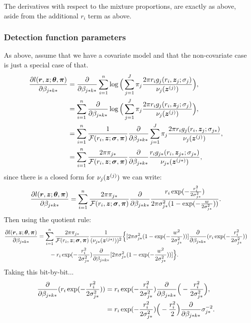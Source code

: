 The derivatives with respect to the mixture proportions, are exactly as above, aside from the additional $r_i$ term as above.


\subsubsection{Detection function parameters}

As above, assume that we have a covariate model and that the non-covariate case is just a special case of that.
\begin{align*}
\frac{\partial l(\bm{r}, \bm{z};\bm{\theta},\bm{\pi})}{\partial \beta_{j*k*}} &= \frac{\partial}{\partial \beta_{j*k*}} \sum_{i=1}^n \log\Big(\sum_{j=1}^J \pi_j \frac{2 \pi r_i g_j(r_i,\bm{z}_j;\sigma_j)}{\nu_j(\bm{z}^{(j)})}\Big),\\
&= \sum_{i=1}^n \frac{\partial}{\partial \beta_{j*k*}} \log\Big(\sum_{j=1}^J \pi_j \frac{2 \pi  r_i g_j(r_i,\bm{z}_j;\sigma_j)}{\nu_j(\bm{z}^{(j)})}\Big),\\
&= \sum_{i=1}^n \frac{1}{\mathcal{F}(r_i,\bm{z};\bm{\sigma},\bm{\pi})} \frac{\partial}{\partial \beta_{j*k*}} \sum_{j=1}^J \pi_j \frac{2 \pi r_i g_j(r_i,\bm{z}_j;\sigma_{j*})}{\nu_j(\bm{z}^{(j)})},\\
&= \sum_{i=1}^n \frac{2 \pi  \pi_{j*}}{\mathcal{F}(r_i,\bm{z};\bm{\sigma},\bm{\pi})} \frac{\partial}{\partial \beta_{j*k*}} \frac{r_i g_{j*}(r_i,\bm{z}_{j*};\sigma_{j*})}{\nu_{j*}(\bm{z}^{(j*)})},\\
\end{align*}
since there is a closed form for $\nu_j(\bm{z}^{(j)})$ we can write:
\begin{align*}
\frac{\partial l(\bm{r}, \bm{z};\bm{\theta},\bm{\pi})}{\partial \beta_{j*k*}} &= \sum_{i=1}^n \frac{2 \pi \pi_{j*}}{\mathcal{F}(r_i,\bm{z};\bm{\sigma},\bm{\pi})} \frac{\partial}{\partial \beta_{j*k*}} \frac{r_i \exp( -\frac{r_i^2}{2\sigma_{j*}^2})}{2 \pi \sigma_{j*}^2 (1-\exp( -\frac{w}{2\sigma_{j*}^2}))}.\\
\end{align*}
Then using the quotient rule:
\begin{align*}
\frac{\partial l(\bm{r}, \bm{z};\bm{\theta},\bm{\pi})}{\partial \beta_{j*k*}} &= \sum_{i=1}^n \frac{2 \pi \pi_{j*}}{\mathcal{F}(r_i,\bm{z};\bm{\sigma},\bm{\pi})}\frac{1}{(\nu_{j*}(\bm{z}^{(j*)}))^2} \Big\{  [2 \pi\sigma_{j*}^2(1-\exp( -\frac{w^2}{2\sigma_{j*}^2}))] \frac{\partial}{\partial \beta_{j*k*}} (r_i \exp( -\frac{r_i^2}{2\sigma_{j*}^2}))\\
&\qquad -r_i \exp( -\frac{r_i^2}{2\sigma_{j*}^2}) \frac{\partial}{\partial \beta_{j*k*}} [2 \pi\sigma_{j*}^2(1-\exp( -\frac{w^2}{2\sigma_{j*}^2}))]\Big\}.\\
\end{align*}
Taking this bit-by-bit...
\begin{align*}
\frac{\partial}{\partial \beta_{j*k*}} (r_i \exp( -\frac{r_i^2}{2\sigma_{j*}^2}))&= r_i \exp( -\frac{r_i^2}{2\sigma_{j*}^2})\frac{\partial}{\partial \beta_{j*k*}} \Big(-\frac{r_i^2}{2\sigma_{j*}^2} \Big),\\
&= r_i \exp( -\frac{r_i^2}{2\sigma_{j*}^2}) \Big(-\frac{r_i^2}{2} \Big) \frac{\partial}{\partial \beta_{j*k*}} \sigma_{j*}^{-2}.
\end{align*}
